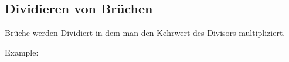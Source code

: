 \subsection{Dividieren von Brüchen}

Brüche werden Dividiert in dem man den Kehrwert des Divisors multipliziert.

\hfill \break
Example:
\fboxrule=0.8pt 